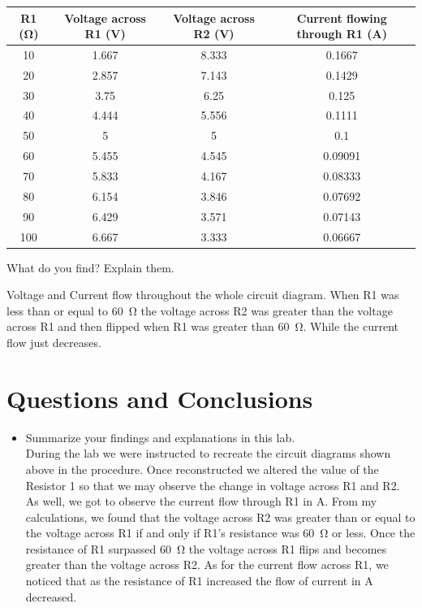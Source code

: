 \documentclass[a4paper]{article}
\newcommand\tab[1][0.5cm]{\hspace*{#1}}
\begin{document}
\begin{tabular}{|c|c|c|c|}
	\hline
	R1 (\si{\ohm}) & Voltage across R1 (\si{\volt}) & Voltage across R2 (\si{\volt}) & Current flowing through R1 (\si{\ampere}) \\
	\hline
	10        & 1.667                 & 8.333                 & 0.1667                         \\
	\hline
	20        & 2.857                 & 7.143                 & 0.1429                         \\
	\hline
	30        & 3.75                  & 6.25                  & 0.125                          \\
	\hline
	40        & 4.444                 & 5.556                 & 0.1111                         \\
	\hline
	50        & 5                     & 5                     & 0.1                            \\
	\hline
	60        & 5.455                 & 4.545                 & 0.09091                        \\
	\hline
	70        & 5.833                 & 4.167                 & 0.08333                        \\
	\hline
	80        & 6.154                 & 3.846                 & 0.07692                        \\
	\hline
	90        & 6.429                 & 3.571                 & 0.07143                        \\
	\hline
	100       & 6.667                 & 3.333                 & 0.06667                        \\
	\hline
\end{tabular}

\tab What do you find? Explain them.

\tab\tab Voltage and Current flow throughout the whole circuit diagram. When R1 was less than or equal to \SI{60}{\ohm} the voltage across R2 was greater than the voltage across R1 and then flipped when R1 was greater than \SI{60}{\ohm}. While the current flow just decreases.


\section*{Questions and Conclusions}
\begin{itemize}
	\item Summarize your findings and explanations in this lab. \\
	During the lab we were instructed to recreate the circuit diagrams shown above in the procedure. Once reconstructed we altered the value of the Resistor 1 so that we may observe the change in voltage across R1 and R2. As well, we got to observe the current flow through R1 in \si{\ampere}. From my calculations, we found that the voltage across R2 was greater than or equal to the voltage across R1 if and only if R1's resistance was \SI{60}{\ohm} or less. Once the resistance of R1 surpassed \SI{60}{\ohm} the voltage across R1 flips and becomes greater than the voltage across R2. As for the current flow across R1, we noticed that as the resistance of R1 increased the flow of current in \si{\ampere} decreased.
\end{itemize}


  
\end{document}
